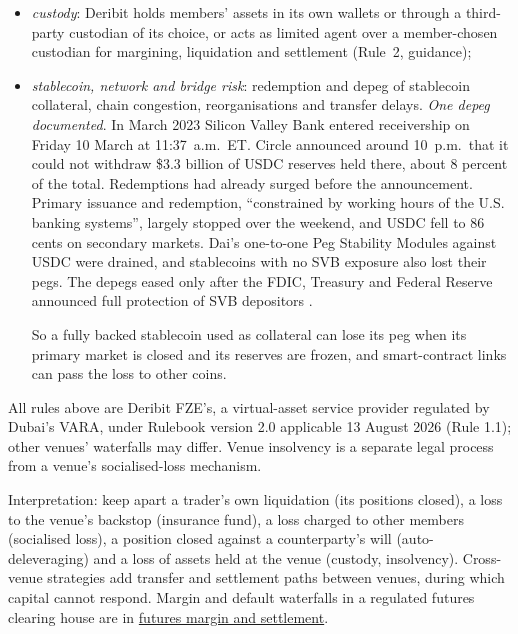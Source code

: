 \begin{qfdefinition}
\begin{itemize}
\item \emph{custody}: Deribit holds members' assets in its own wallets or through a third-party custodian of its choice, or acts as limited agent over a member-chosen custodian for margining, liquidation and settlement (Rule~2, guidance);
\item \emph{stablecoin, network and bridge risk}: redemption and depeg of stablecoin collateral, chain congestion, reorganisations and transfer delays. \emph{One depeg documented}. In March 2023 Silicon Valley Bank entered receivership on Friday 10 March at 11:37~a.m.\ ET. Circle announced around 10~p.m.\ that it could not withdraw \$3.3 billion of USDC reserves held there, about 8 percent of the total. Redemptions had already surged before the announcement. Primary issuance and redemption, ``constrained by working hours of the U.S. banking systems'', largely stopped over the weekend, and USDC fell to 86 cents on secondary markets. Dai's one-to-one Peg Stability Modules against USDC were drained, and stablecoins with no SVB exposure also lost their pegs. The depegs eased only after the FDIC, Treasury and Federal Reserve announced full protection of SVB depositors \citep[FEDS Notes, 17 December 2025, summary and sec.~1]{feds-2025-svb-stablecoins}.

So a fully backed stablecoin used as collateral can lose its peg when its primary market is closed and its reserves are frozen, and smart-contract links can pass the loss to other coins.
\end{itemize}

 All rules above are Deribit FZE's, a virtual-asset service provider regulated by Dubai's VARA, under Rulebook version 2.0 applicable 13 August 2026 (Rule 1.1); other venues' waterfalls may differ. Venue insolvency is a separate legal process from a venue's socialised-loss mechanism.

 Interpretation: keep apart a trader's own liquidation (its positions closed), a loss to the venue's backstop (insurance fund), a loss charged to other members (socialised loss), a position closed against a counterparty's will (auto-deleveraging) and a loss of assets held at the venue (custody, insolvency). Cross-venue strategies add transfer and settlement paths between venues, during which capital cannot respond. Margin and default waterfalls in a regulated futures clearing house are in \hyperref[mech:futures-margin-settlement]{futures margin and settlement}.


\end{qfdefinition}
